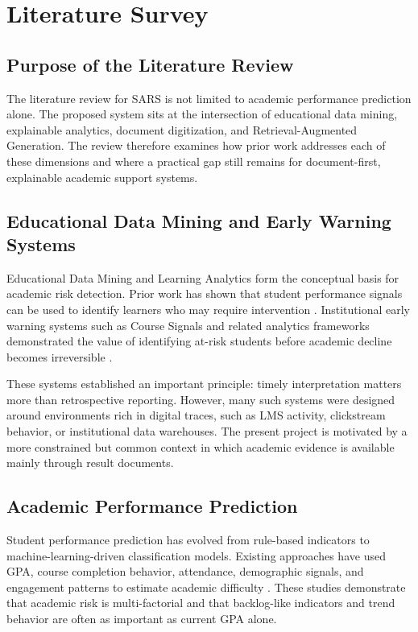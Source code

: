 \chapter{Literature Survey}

\section{Purpose of the Literature Review}
The literature review for SARS is not limited to academic performance prediction alone. The proposed system sits at the intersection of educational data mining, explainable analytics, document digitization, and Retrieval-Augmented Generation. The review therefore examines how prior work addresses each of these dimensions and where a practical gap still remains for document-first, explainable academic support systems.

\section{Educational Data Mining and Early Warning Systems}
Educational Data Mining and Learning Analytics form the conceptual basis for academic risk detection. Prior work has shown that student performance signals can be used to identify learners who may require intervention \cite{baker2014edm}. Institutional early warning systems such as Course Signals and related analytics frameworks demonstrated the value of identifying at-risk students before academic decline becomes irreversible \cite{essa2012predictive,arnold2012course}.

These systems established an important principle: timely interpretation matters more than retrospective reporting. However, many such systems were designed around environments rich in digital traces, such as LMS activity, clickstream behavior, or institutional data warehouses. The present project is motivated by a more constrained but common context in which academic evidence is available mainly through result documents.

\section{Academic Performance Prediction}
Student performance prediction has evolved from rule-based indicators to machine-learning-driven classification models. Existing approaches have used GPA, course completion behavior, attendance, demographic signals, and engagement patterns to estimate academic difficulty \cite{jayaprakash2014early,romero2020survey}. These studies demonstrate that academic risk is multi-factorial and that backlog-like indicators and trend behavior are often as important as current GPA alone.

